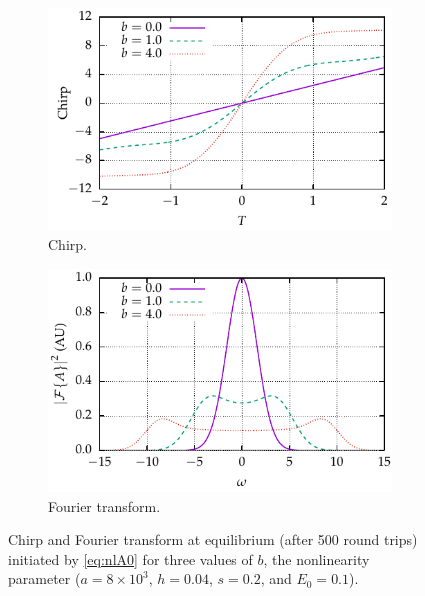 \documentclass[9pt,twocolumn,twoside]{osajnl}
\begin{document}
\begin{figure}[tbp]
	\centering
	\begin{subfigure}{\columnwidth}
		\centering
		\includegraphics{Figures/Chirp}
		\caption{Chirp.}
		\label{fig:chirp}
	\end{subfigure} %
	\begin{subfigure}{\columnwidth}
		\centering
		\includegraphics{Figures/FT}
		\caption{Fourier transform.}
		\label{fig:ft}
	\end{subfigure}
	\caption{Chirp and Fourier transform at equilibrium (after 500 round trips) initiated by \eqref{eq:nlA0} for three values of $b$, the nonlinearity parameter ($a = 8 \times 10^3$, $h = 0.04$, $s = 0.2$, and $E_0 = 0.1$).}
	\label{fig:chirpft}
\end{figure}
\end{document}
